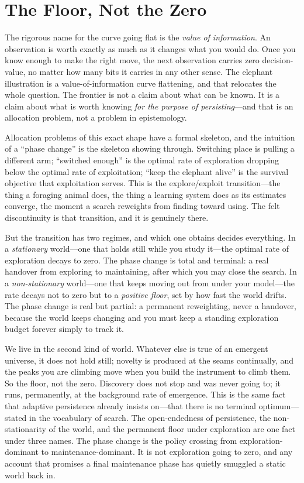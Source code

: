 \documentclass{article}
\begin{document}
\section*{The Floor, Not the Zero}

The rigorous name for the curve going flat is the \textit{value of information}. An observation is worth exactly as much as it changes what you would do. Once you know enough to make the right move, the next observation carries zero decision-value, no matter how many bits it carries in any other sense. The elephant illustration is a value-of-information curve flattening, and that relocates the whole question. The frontier is not a claim about what can be known. It is a claim about what is worth knowing \textit{for the purpose of persisting}---and that is an allocation problem, not a problem in epistemology.

Allocation problems of this exact shape have a formal skeleton, and the intuition of a ``phase change'' is the skeleton showing through. Switching place is pulling a different arm; ``switched enough'' is the optimal rate of exploration dropping below the optimal rate of exploitation; ``keep the elephant alive'' is the survival objective that exploitation serves. This is the explore/exploit transition---the thing a foraging animal does, the thing a learning system does as its estimates converge, the moment a search reweights from finding toward using. The felt discontinuity is that transition, and it is genuinely there.

But the transition has two regimes, and which one obtains decides everything. In a \textit{stationary} world---one that holds still while you study it---the optimal rate of exploration decays to zero. The phase change is total and terminal: a real handover from exploring to maintaining, after which you may close the search. In a \textit{non-stationary} world---one that keeps moving out from under your model---the rate decays not to zero but to a \textit{positive floor}, set by how fast the world drifts. The phase change is real but partial: a permanent reweighting, never a handover, because the world keeps changing and you must keep a standing exploration budget forever simply to track it.

We live in the second kind of world. Whatever else is true of an emergent universe, it does not hold still; novelty is produced at the seams continually, and the peaks you are climbing move when you build the instrument to climb them. So the floor, not the zero. Discovery does not stop and was never going to; it runs, permanently, at the background rate of emergence. This is the same fact that adaptive persistence already insists on---that there is no terminal optimum---stated in the vocabulary of search. The open-endedness of persistence, the non-stationarity of the world, and the permanent floor under exploration are one fact under three names. The phase change is the policy crossing from exploration-dominant to maintenance-dominant. It is not exploration going to zero, and any account that promises a final maintenance phase has quietly smuggled a static world back in.
\end{document}
